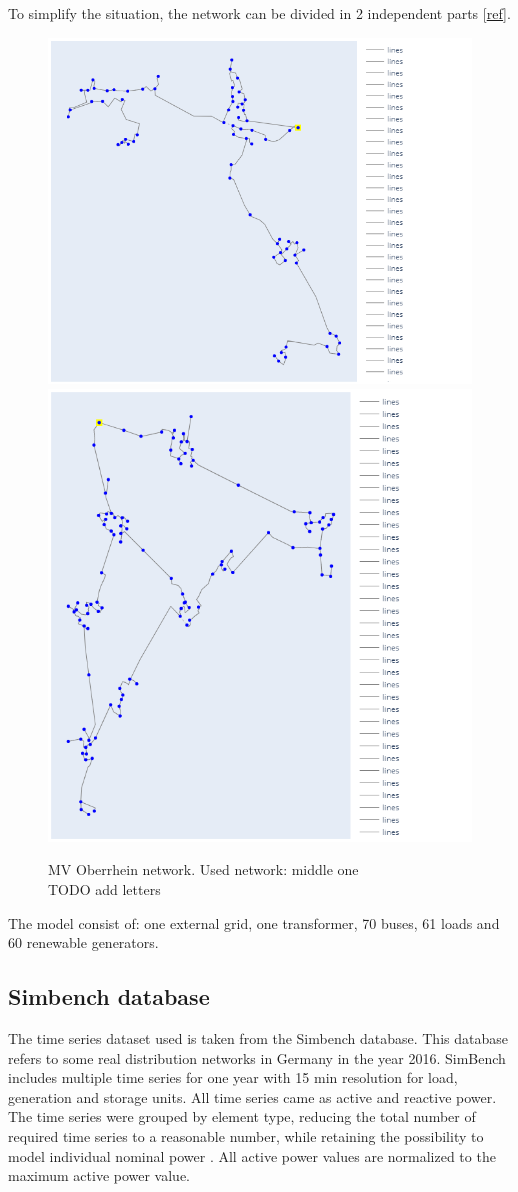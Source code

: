 To simplify the situation, the network can be divided in 2 independent parts [\href{https://kobra.uni-kassel.de/bitstream/handle/123456789/12005/kup_9783737608725.pdf?sequence=1&isAllowed=y}{ref}].

\begin{figure}[h]
\centering
    \includegraphics[height=0.33\linewidth,width=.32\linewidth]{images/MVOberr/Half1.png}
    \includegraphics[height=0.33\linewidth,width=.32\linewidth]{images/MVOberr/Half2.png}
\caption{MV Oberrhein network. Used network: middle one \\
TODO add letters}
\end{figure}

The model consist of: one external grid, one transformer, 70 buses, 61 loads and 60 renewable generators.

\subsection{Simbench database}
\label{simdata}
The time series dataset used is taken from the Simbench database. This database refers to some real distribution networks in Germany in the year 2016. SimBench includes multiple time series for one year with 15 min resolution for load, generation and storage units. All time series came as active and reactive power. The time series were grouped by element type, reducing the total number of required time series to a reasonable number, while retaining the possibility to model individual nominal power \cite{Simbenchds0}. All active power values are normalized to the maximum active power value.\\


